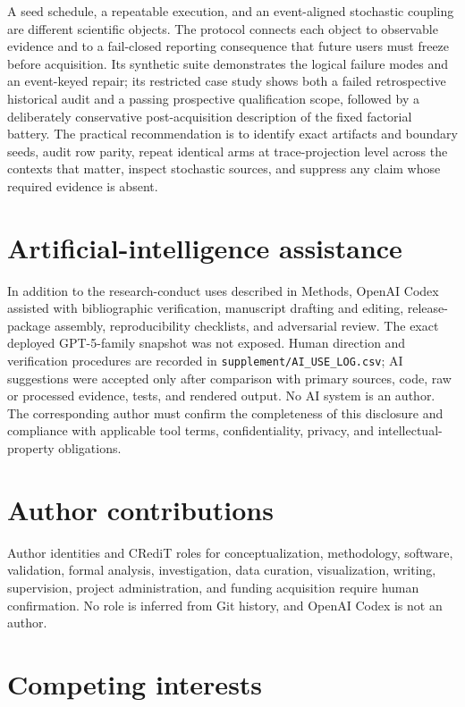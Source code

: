 \documentclass[aps,reprint,superscriptaddress,longbibliography,floatfix]{revtex4-2}
\begin{document}
A seed schedule, a repeatable execution, and an event-aligned stochastic
coupling are different scientific objects.  The protocol connects each object
to observable evidence and to a fail-closed reporting consequence that future
users must freeze before acquisition.  Its synthetic suite demonstrates the
logical failure modes and an event-keyed repair; its restricted case study
shows both a failed retrospective historical audit and a passing prospective
qualification scope, followed by a deliberately conservative post-acquisition
description of the fixed factorial battery.  The practical recommendation is
to identify exact artifacts and boundary seeds, audit row parity, repeat
identical arms at trace-projection level across the contexts that matter,
inspect stochastic sources, and suppress any claim whose required evidence is
absent.

\section*{Artificial-intelligence assistance}

In addition to the research-conduct uses described in Methods, OpenAI Codex
assisted with bibliographic verification, manuscript drafting and editing,
release-package assembly, reproducibility checklists, and adversarial review.
The exact deployed GPT-5-family snapshot was not exposed.  Human direction and
verification procedures are recorded in \texttt{supplement/AI\_USE\_LOG.csv};
AI suggestions were accepted only after comparison with primary sources, code,
raw or processed evidence, tests, and rendered output.  No AI system is an
author.  The corresponding author must confirm the completeness of this
disclosure and compliance with applicable tool terms, confidentiality,
privacy, and intellectual-property obligations.

\section*{Author contributions}

Author identities and CRediT roles for conceptualization, methodology,
software, validation, formal analysis, investigation, data curation,
visualization, writing, supervision, project administration, and funding
acquisition require human confirmation.  No role is inferred from Git history,
and OpenAI Codex is not an author.

\section*{Competing interests}
\end{document}

